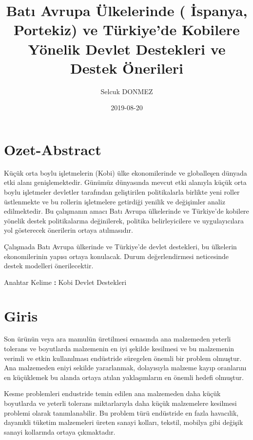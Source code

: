 \documentclass[]{book}
\title{Batı Avrupa Ülkelerinde ( İspanya, Portekiz) ve Türkiye'de Kobilere Yönelik Devlet Destekleri ve Destek Önerileri}
\author{Selcuk DONMEZ}
\date{2019-08-20}
\newenvironment{Shaded}{\begin{snugshade}}{\end{snugshade}}
\newcommand{\NormalTok}[1]{#1}
\newcommand{\OperatorTok}[1]{\textcolor[rgb]{0.81,0.36,0.00}{\textbf{#1}}}
\begin{document}
\maketitle

{
\setcounter{tocdepth}{1}
\tableofcontents
}
\hypertarget{ozet-abstract}{%
\chapter{Ozet-Abstract}\label{ozet-abstract}}

Küçük orta boylu işletmelerin (Kobi) ülke ekonomilerinde ve globalleşen dünyada etki alanı genişlemektedir. Günümüz dünyasında mevcut etki alanıyla küçük orta boylu işletmeler devletler tarafından geliştirilen politikalarla birlikte yeni roller üstlenmekte ve bu rollerin işletmelere getirdiği yenilik ve değişimler analiz edilmektedir. Bu çalışmanın amacı Batı Avrupa ülkelerinde ve Türkiye'de kobilere yönelik destek politikalarına değinilerek, politika belirleyicilere ve uygulayıcılara yol gösterecek önerilerin ortaya atılmasıdır.

Çalışmada Batı Avrupa ülkerinde ve Türkiye'de devlet destekleri, bu ülkelerin ekonomilerinin yapısı ortaya konulacak. Durum değerlendirmesi neticesinde destek modelleri önerilecektir.

\begin{Shaded}
\begin{Highlighting}[]
\NormalTok{Anahtar Kelime }\OperatorTok{:}
\NormalTok{Kobi}
\NormalTok{Devlet Destekleri}
\end{Highlighting}
\end{Shaded}

\hypertarget{intro}{%
\chapter{Giris}\label{intro}}

Son ürünün veya ara mamulün üretilmesi esnasında ana malzemeden yeterli tolerans ve boyutlarda malzemenin en iyi şekilde kesilmesi ve bu malzemenin verimli ve etkin kullanılması endüstride süregelen önemli bir problem olmuştur. Ana malzemeden eniyi sekilde yararlanmak, dolayısıyla malzeme kayıp oranlarını en küçüklemek bu alanda ortaya atılan yaklaşımların en önemli hedefi olmuştur.

Kesme problemleri endustride temin edilen ana malzemeden daha küçük boyutlarda ve yeterli tolerans miktarlarıyla daha küçük malzemelere kesilmesi problemi olarak tanımlanabilir. Bu problem türü endüstride en fazla havacılik, dayanıkli tüketim malzemeleri üreten sanayi kolları, tekstil, mobilya gibi değişik sanayi kollarında ortaya çıkmaktadır.
\end{document}

